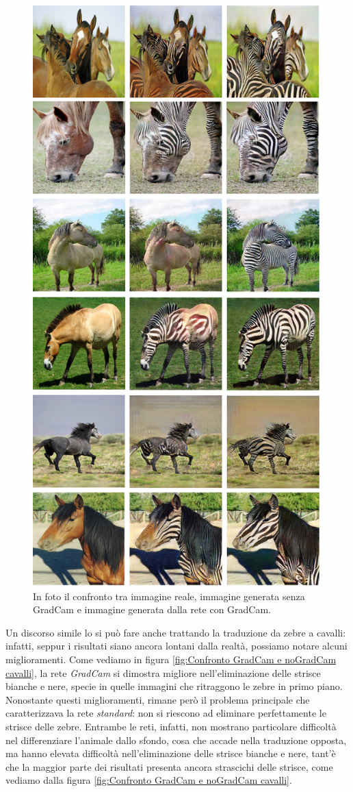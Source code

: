 \begin{figure}[H]
\begin{center}
\includegraphics[width=0.6\columnwidth]{images/merge zebre.png}
\end{center}
\caption{In foto il confronto tra immagine reale, immagine generata senza GradCam e immagine generata dalla rete con GradCam.}
\label{fig:Confronto GradCam e noGradCam}
\end{figure}  
Un discorso simile lo si può fare anche trattando la traduzione da zebre a cavalli: infatti, seppur i risultati siano ancora lontani dalla realtà, possiamo notare alcuni miglioramenti. Come vediamo in figura \ref{fig:Confronto GradCam e noGradCam cavalli}, la rete \emph{GradCam} si dimostra migliore nell'eliminazione delle strisce bianche e nere, specie in quelle immagini che ritraggono le zebre in primo piano. 
\\Nonostante questi miglioramenti, rimane però il problema principale che caratterizzava la rete \emph{standard}: non si riescono ad eliminare perfettamente le strisce delle zebre. Entrambe le reti, infatti, non mostrano particolare difficoltà nel differenziare l'animale dallo sfondo, cosa che accade nella traduzione opposta, ma hanno elevata difficoltà nell'eliminazione delle strisce bianche e nere, tant'è che la maggior parte dei risultati presenta ancora strascichi delle strisce, come vediamo dalla figura \ref{fig:Confronto GradCam e noGradCam cavalli}.


